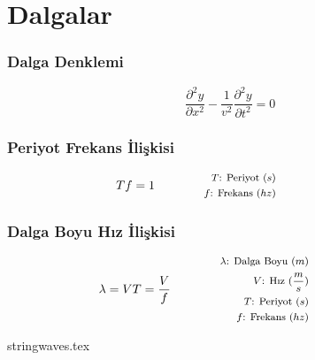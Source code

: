 \section{Dalgalar}

\subsubsection*{Dalga Denklemi}
\begin{equation}
    \frac{\partial ^2 y}{\partial x^2} - \frac{1}{v^2} \frac{\partial^2 y}{\partial t^2} = 0
\end{equation}

\subsubsection*{Periyot Frekans İlişkisi}
\begin{equation}
    Tf=1 \qquad \qquad \parbox{4cm}{\footnotesize$\begin{aligned}
        T\text{: Periyot } (s) \\
        f\text{: Frekans } (hz)
\end{aligned}$}
\end{equation}

\subsubsection*{Dalga Boyu Hız İlişkisi}
\begin{equation}
    \lambda = VT = \frac{V}{f} \qquad \qquad \parbox{4cm}{\footnotesize$\begin{aligned}
        \lambda\text{: Dalga Boyu } (m) \\
        V\text{: Hız } (\frac{m}{s}) \\
        T\text{: Periyot } (s) \\
        f\text{: Frekans } (hz)
\end{aligned}$}
\end{equation}

{stringwaves.tex}
